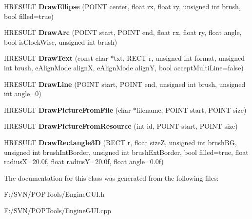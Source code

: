 \begin{DoxyCompactItemize}
\item 
\hypertarget{class_engine_g_u_i_aaf90583d3c91080a1a750e67805abdd7}{H\-R\-E\-S\-U\-L\-T {\bfseries Draw\-Ellipse} (P\-O\-I\-N\-T center, float rx, float ry, unsigned int brush, bool filled=true)}\label{class_engine_g_u_i_aaf90583d3c91080a1a750e67805abdd7}

\item 
\hypertarget{class_engine_g_u_i_aebe15c59ef2f1745d072f7d8b9bcb2b3}{H\-R\-E\-S\-U\-L\-T {\bfseries Draw\-Arc} (P\-O\-I\-N\-T start, P\-O\-I\-N\-T end, float rx, float ry, float angle, bool is\-Clock\-Wise, unsigned int brush)}\label{class_engine_g_u_i_aebe15c59ef2f1745d072f7d8b9bcb2b3}

\item 
\hypertarget{class_engine_g_u_i_a563e05f01065cde6c82e47a1eb4fdeea}{H\-R\-E\-S\-U\-L\-T {\bfseries Draw\-Text} (const char $\ast$txt, R\-E\-C\-T r, unsigned int format, unsigned int brush, e\-Align\-Mode align\-X, e\-Align\-Mode align\-Y, bool accept\-Multi\-Line=false)}\label{class_engine_g_u_i_a563e05f01065cde6c82e47a1eb4fdeea}

\item 
\hypertarget{class_engine_g_u_i_a9665be1816c3541751729fdc6b4c9528}{H\-R\-E\-S\-U\-L\-T {\bfseries Draw\-Line} (P\-O\-I\-N\-T start, P\-O\-I\-N\-T end, unsigned int brush, unsigned int angle=0)}\label{class_engine_g_u_i_a9665be1816c3541751729fdc6b4c9528}

\item 
\hypertarget{class_engine_g_u_i_a92c58187c0257ae4d9f54ab05152f9e9}{H\-R\-E\-S\-U\-L\-T {\bfseries Draw\-Picture\-From\-File} (char $\ast$filename, P\-O\-I\-N\-T start, P\-O\-I\-N\-T size)}\label{class_engine_g_u_i_a92c58187c0257ae4d9f54ab05152f9e9}

\item 
\hypertarget{class_engine_g_u_i_a34920930346eeffa575902894cd59130}{H\-R\-E\-S\-U\-L\-T {\bfseries Draw\-Picture\-From\-Resource} (int id, P\-O\-I\-N\-T start, P\-O\-I\-N\-T size)}\label{class_engine_g_u_i_a34920930346eeffa575902894cd59130}

\item 
\hypertarget{class_engine_g_u_i_ac3381c8e44d06325dc891a5a3b0cf2c2}{H\-R\-E\-S\-U\-L\-T {\bfseries Draw\-Rectangle3\-D} (R\-E\-C\-T r, float size\-Z, unsigned int brush\-B\-G, unsigned int brush\-Int\-Border, unsigned int brush\-Ext\-Border, bool filled=true, float radius\-X=20.\-0f, float radius\-Y=20.\-0f, float angle=0.\-0f)}\label{class_engine_g_u_i_ac3381c8e44d06325dc891a5a3b0cf2c2}

\end{DoxyCompactItemize}


The documentation for this class was generated from the following files\-:\begin{DoxyCompactItemize}
\item 
F\-:/\-S\-V\-N/\-P\-O\-P\-Tools/Engine\-G\-U\-I.\-h\item 
F\-:/\-S\-V\-N/\-P\-O\-P\-Tools/Engine\-G\-U\-I.\-cpp\end{DoxyCompactItemize}
